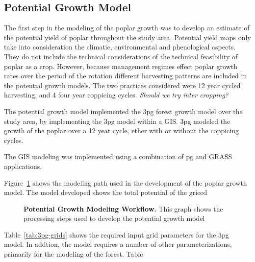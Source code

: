 \documentclass[10pt]{article}
\begin{document}
\subsection*{Potential Growth Model}

The first step in the modeling of the poplar growth was to develop an
estimate of the potential yield of poplar throughout the study area.
Potential yield maps only take into consideration the climatic,
environmental and phenological aspects.  They do not include the
technical considerations of the technical feasibility of poplar as a
crop.  However, because management regimes effect poplar growth rates
over the period of the rotation different harvesting patterns are
included in the potential growth models.  The two practices considered
were 12 year cycled harvesting, and 4 four year coppicing cycles.
\emph{Should we try inter cropping?}

The potential growth model implemented the \ac{3pg} forest growth
model over the study area, by implementing the \ac{3pg} model within a
\ac{GIS}.  \ac{3pg} modeled the growth of the poplar over a 12 year
cycle, ether with or without the coppicing cycles.  

The \ac{GIS} modeling was implemented using a combination of \ac{pg}
and \ac{GRASS} applications.

Figure~\ref{fig:growth-model} shows the modeling path used in the
development of the poplar growth model. The model developed shows the
total potential of the grieed

\begin{figure}[!ht]
\begin{center}
\end{center}
\caption{ {\bf Potential Growth Modeling Workflow.} This graph shows
  the processing steps used to develop the potential growth model }
\label{fig:growth-model}
\end{figure}

Table~\ref{tab:3pg-grids} shows the required input grid parameters for
the \ac{3pg} model.  In addtion, the model requires a number of other
parameterizations, primarily for the modeling of the forest. Table
\end{document}
